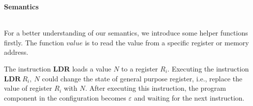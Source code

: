 \documentclass[conference]{IEEEtran}
\begin{document}
\textbf{Semantics}\\ \\
\par For a better understanding of our semantics, we introduce some helper functions firstly. The function $value$ is to read the value from a specific register or memory address.
\par The instruction \textbf{LDR} loads a value $N$ to a register $R_i$. Executing the instruction $\textbf{LDR}~R_i,~N$ could change the state of general purpose register, i.e., replace the value of register $R_i$ with $N$. After executing this instruction, the program component in the configuration becomes $\varepsilon$ and waiting for the next instruction.\\ \\
\end{document}
